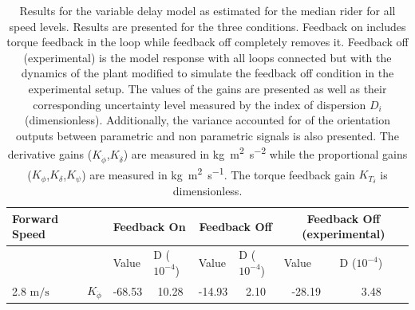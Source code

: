 \begin{table}[]
    \caption{ Results for the variable delay model as estimated for the median rider for all speed levels. Results are presented for the three conditions. Feedback on includes torque feedback in the loop while feedback off completely removes it. Feedback off (experimental) is the model response with all loops connected but with the dynamics of the plant modified to simulate the feedback off condition in the experimental setup. The values of the gains are presented as well as their corresponding uncertainty level measured by the index of dispersion \ensuremath{D_i} (dimensionless). Additionally, the variance accounted for of the orientation outputs between parametric and non parametric signals is also presented. The derivative gains (\ensuremath{K_{\dot{\phi}}},\ensuremath{K_{\dot{\delta}}}) are measured in \si{\kilogram\square\meter\per\square\second} while the proportional gains (\ensuremath{K_{\phi}},\ensuremath{K_{\delta}},\ensuremath{K_{\psi}}) are measured in \si{\kilogram\square\meter\per\second}. The torque feedback gain \ensuremath{K_{T_\delta}} is dimensionless.}
    \begin{tabular}{llcccccc}
    \hline
    Forward Speed                &                       & \multicolumn{2}{l}{Feedback On}                                                                 & \multicolumn{2}{c}{Feedback Off}                                                                & \multicolumn{2}{c}{Feedback Off (experimental)}                                                 \\ \hline
                                 &                       & \multicolumn{1}{l}{\multirow{2}{*}{Value}} & \multicolumn{1}{l}{\multirow{2}{*}{D ($10^{-4}$)}} & \multicolumn{1}{l}{\multirow{2}{*}{Value}} & \multicolumn{1}{l}{\multirow{2}{*}{D ($10^{-4}$)}} & \multicolumn{1}{l}{\multirow{2}{*}{Value}} & \multicolumn{1}{l}{\multirow{2}{*}{D ($10^{-4}$)}} \\
                                 &                       & \multicolumn{1}{l}{}                       & \multicolumn{1}{l}{}                               & \multicolumn{1}{l}{}                       & \multicolumn{1}{l}{}                               & \multicolumn{1}{l}{}                       & \multicolumn{1}{l}{}                               \\ \cline{3-8} 
    2.8 $\si{\meter\per\second}$ & $K_{\dot{\phi}} $     & -68.53                                     & 10.28                                              & -14.93                                     & 2.10                                               & -28.19                                     & 3.48                                               \\

\end{tabular}
\end{table}
